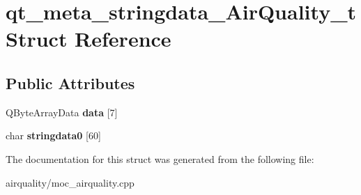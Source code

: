 \hypertarget{structqt__meta__stringdata__AirQuality__t}{}\section{qt\+\_\+meta\+\_\+stringdata\+\_\+\+Air\+Quality\+\_\+t Struct Reference}
\label{structqt__meta__stringdata__AirQuality__t}
\subsection*{Public Attributes}
\begin{DoxyCompactItemize}
\item 
\mbox{\label{structqt__meta__stringdata__AirQuality__t_a8c96a2269c4467460fee344bc11e35e0}} 
Q\+Byte\+Array\+Data {\bfseries data} \mbox{[}7\mbox{]}
\item 
\mbox{\label{structqt__meta__stringdata__AirQuality__t_a3438a6fa455b17a22319e84035bd7893}} 
char {\bfseries stringdata0} \mbox{[}60\mbox{]}
\end{DoxyCompactItemize}


The documentation for this struct was generated from the following file\+:\begin{DoxyCompactItemize}
\item 
airquality/moc\+\_\+airquality.\+cpp\end{DoxyCompactItemize}

